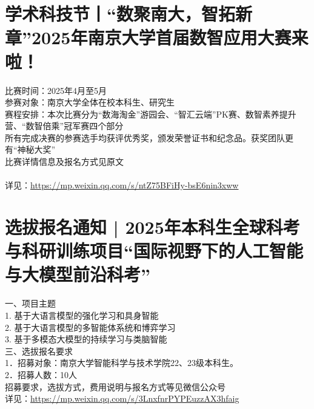 \documentclass[letterpaper, 12pt]{article}
\begin{document}
\begin{multicols}{2}
\section{学术科技节丨“数聚南大，智拓新章”2025年南京大学首届数智应用大赛来啦！}
比赛时间：2025年4月至5月
\\参赛对象：南京大学全体在校本科生、研究生
\\赛程安排：本次比赛分为“数海淘金”游园会、“智汇云端”PK赛、数智素养提升营、“数智倍乘”冠军赛四个部分
\\所有完成决赛的参赛选手均获评优秀奖，颁发荣誉证书和纪念品。获奖团队更有“神秘大奖”
\\比赛详情信息及报名方式见原文
\\
\\详见：\url{https://mp.weixin.qq.com/s/ntZ75BFiHy-bsE6nin3xww}


\section{选拔报名通知 | 2025年本科生全球科考与科研训练项目“国际视野下的人工智能与大模型前沿科考”}
一、项目主题
\\1.   基于大语言模型的强化学习和具身智能
\\2.   基于大语言模型的多智能体系统和博弈学习
\\3.   基于多模态大模型的持续学习与类脑智能
\\三、选拔报名要求
\\1．招募对象：南京大学智能科学与技术学院22、23级本科生。
\\2．招募人数：10人
\\招募要求，选拔方式，费用说明与报名方式等见微信公众号
\\详见：\url{https://mp.weixin.qq.com/s/3LnxfnrPYPEuzzAX3hfaig}


\end{multicols}
\end{document}
